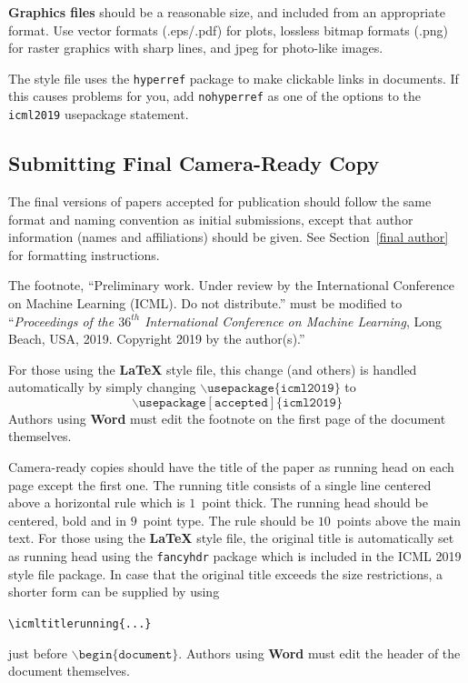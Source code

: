 \documentclass{article}
\begin{document}
\textbf{Graphics files} should be a reasonable size, and included from
an appropriate format. Use vector formats (.eps/.pdf) for plots,
lossless bitmap formats (.png) for raster graphics with sharp lines, and
jpeg for photo-like images.

The style file uses the \texttt{hyperref} package to make clickable
links in documents. If this causes problems for you, add
\texttt{nohyperref} as one of the options to the \texttt{icml2019}
usepackage statement.


\subsection{Submitting Final Camera-Ready Copy}

The final versions of papers accepted for publication should follow the
same format and naming convention as initial submissions, except that
author information (names and affiliations) should be given. See
Section~\ref{final author} for formatting instructions.

The footnote, ``Preliminary work. Under review by the International
Conference on Machine Learning (ICML). Do not distribute.'' must be
modified to ``\textit{Proceedings of the
$\mathit{36}^{th}$ International Conference on Machine Learning},
Long Beach, USA, 2019.
Copyright 2019 by the author(s).''

For those using the \textbf{\LaTeX} style file, this change (and others) is
handled automatically by simply changing
$\mathtt{\backslash usepackage\{icml2019\}}$ to
$$\mathtt{\backslash usepackage[accepted]\{icml2019\}}$$
Authors using \textbf{Word} must edit the
footnote on the first page of the document themselves.

Camera-ready copies should have the title of the paper as running head
on each page except the first one. The running title consists of a
single line centered above a horizontal rule which is $1$~point thick.
The running head should be centered, bold and in $9$~point type. The
rule should be $10$~points above the main text. For those using the
\textbf{\LaTeX} style file, the original title is automatically set as running
head using the \texttt{fancyhdr} package which is included in the ICML
2019 style file package. In case that the original title exceeds the
size restrictions, a shorter form can be supplied by using

\verb|\icmltitlerunning{...}|

just before $\mathtt{\backslash begin\{document\}}$.
Authors using \textbf{Word} must edit the header of the document themselves.
\end{document}
